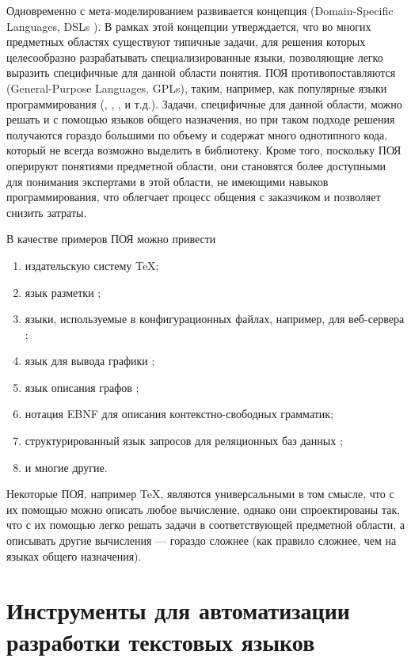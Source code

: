 Одновременно с мета-моделированием развивается концепция  (Domain-Specific Languages, DSLs \cite{StateMachine}). В рамках этой концепции утверждается, что во многих предметных областях существуют типичные задачи, для решения которых целесообразно разрабатывать специализированные языки, позволяющие легко выразить специфичные для данной области понятия. ПОЯ противопоставляются  (General-Purpose Languages, GPLs), таким, например, как популярные языки программирования (, , ,  и т.д.). Задачи, специфичные для данной области, можно решать и с помощью языков общего назначения, но при таком подходе решения получаются гораздо большими по объему и содержат много однотипного кода, который не всегда возможно выделить в библиотеку. Кроме того, поскольку ПОЯ оперируют понятиями предметной области, они становятся более доступными для понимания экспертами в этой области, не имеющими навыков программирования, что облегчает процесс общения с заказчиком и позволяет снизить затраты.

В качестве примеров ПОЯ можно привести
\begin{enumerate}
\item издательскую систему \TeX ;
\item язык разметки ;
\item языки, используемые в конфигурационных файлах, например, для веб-сервера ;
\item язык для вывода графики ;
\item язык описания графов ;
\item нотация EBNF для описания контекстно-свободных грамматик;
\item структурированный язык запросов для реляционных баз данных ;
\item и многие другие.
\end{enumerate}

Некоторые ПОЯ, например \TeX , являются универсальными в том смысле, что с их помощью можно описать любое вычисление, однако они спроектированы так, что с их помощью легко решать задачи в соответствующей предметной области, а описывать другие вычисления --- гораздо сложнее (как правило сложнее, чем на языках общего назначения).



\chapter{Инструменты для автоматизации разработки текстовых языков}

